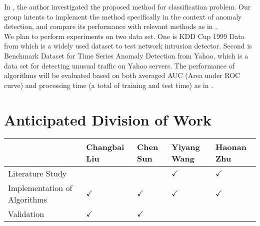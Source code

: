 \documentclass[a4paper, 11pt]{article}
\begin{document}
\noindent
In \cite{Lei (2013)}, the author investigated the proposed method for classification problem. Our group intents to implement the method specifically in the context of anomaly detection, and compare its performance with relevant methods as in \cite{Sricharan and Hero (2011)}\cite{Zhao and Saligrama (2009)}.\\

\noindent
We plan to perform experiments on two data set. One is KDD Cup 1999 Data from \cite{Asuncion and Newman (2007)} which is a widely used dataset to test network intrusion detector. Second is Benchmark Dataset for Time Series Anomaly Detection \cite{Laptev and Amizadeh (2015)}\cite{S. Rayana (2016)} from Yahoo, which is a data set for detecting unusual traffic on Yahoo servers. The performance of algorithms will be evaluated based on both averaged AUC (Area under ROC curve) and processing time (a total of training and test time) as in \cite{Sricharan and Hero (2011)}. 

\section*{Anticipated Division of Work}
\begin{center}
    \begin{tabular}{| l | l | l | l | l |}
    \hline
    & Changbai Liu & Chen Sun & Yiyang Wang & Haonan Zhu \\ \hline
    Literature Study &  &  & $\checkmark$  & $\checkmark$ \\ \hline
    Implementation of Algorithms & $\checkmark$ & $\checkmark$ & $\checkmark$  & $\checkmark$ \\ \hline
    Validation & $\checkmark$ & $\checkmark$  &  & \\
    \hline
    \end{tabular}
\end{center}
\end{document}
